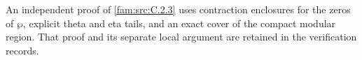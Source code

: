 \begin{remark}
\hypertarget{tag-034N}{}\label{push:section:E.4}\label{sec:e4}
\hypertarget{tag-033L}{}\label{push:src:E.4.1}
\hypertarget{tag-033M}{}\label{push:src:E.4.2}
An independent proof of \cref{fam:src:C.2.3} uses contraction
enclosures for the zeros of $\wp$, explicit theta and eta tails,
and an exact cover of the compact modular region. That proof and
its separate local argument are retained in the verification records.
\end{remark}

\clearpage\appendix

\appendix
